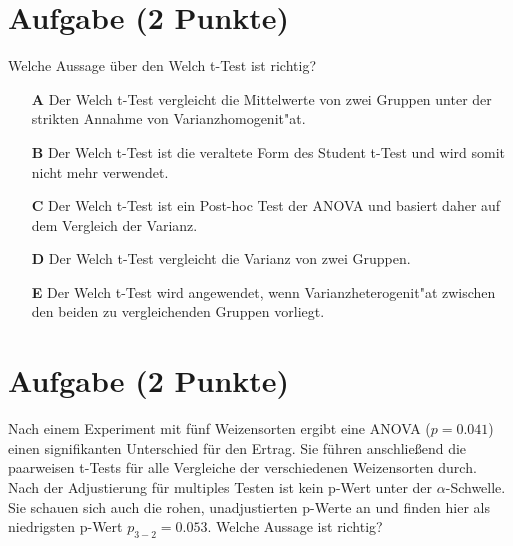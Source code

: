 \documentclass[a4paper, 10pt]{scrartcl}\usepackage[]{graphicx}\usepackage[]{xcolor}
\begin{document}
\section{Aufgabe \hfill (2 Punkte)}

Welche Aussage {\"u}ber den Welch t-Test ist richtig?



\begin{enumerate}
\item [\textbf{A} \msquare] Der Welch t-Test vergleicht die Mittelwerte von zwei Gruppen unter der strikten Annahme von Varianzhomogenit{"a}t.
\item [\textbf{B} \msquare] Der Welch t-Test ist die veraltete Form des Student t-Test und wird somit nicht mehr verwendet.
\item [\textbf{C} \msquare] Der Welch t-Test ist ein Post-hoc Test der ANOVA und basiert daher auf dem Vergleich der Varianz.
\item [\textbf{D} \msquare] Der Welch t-Test vergleicht die Varianz von zwei Gruppen.
\item [\textbf{E} \msquare] Der Welch t-Test wird angewendet, wenn Varianzheterogenit{"a}t zwischen den beiden zu vergleichenden Gruppen vorliegt.
\end{enumerate}  

\section{Aufgabe \hfill (2 Punkte)}

Nach einem Experiment mit f{\"u}nf Weizensorten ergibt eine ANOVA ($p = 0.041$)
einen signifikanten Unterschied f{\"u}r den Ertrag. Sie f{\"u}hren anschlie{\ss}end die
paarweisen t-Tests f{\"u}r alle Vergleiche der verschiedenen Weizensorten
durch. Nach der Adjustierung f{\"u}r multiples Testen ist kein p-Wert unter der
$\alpha$-Schwelle. Sie schauen sich auch die rohen, unadjustierten p-Werte
an und finden hier als niedrigsten p-Wert $p_{3-2} = 0.053$. Welche Aussage
ist richtig? 
\end{document}
